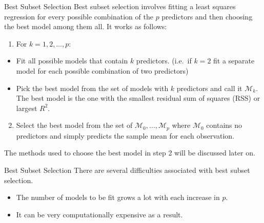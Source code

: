 \documentclass[
  ignorenonframetext,
  aspectratio=169,
]{beamer}
\providecommand{\tightlist}{%
  \setlength{\itemsep}{0pt}\setlength{\parskip}{0pt}}\usepackage{longtable,booktabs,array}
\begin{document}
\begin{frame}{Best Subset Selection}
\protect\hypertarget{best-subset-selection}{}
Best subset selection involves fitting a least squares regression for
every possible combination of the \(p\) predictors and then choosing the
best model among them all. It works as follows:

\begin{enumerate}
\tightlist
\item
  For \(k = 1,2, \dots, p\):
\end{enumerate}

\begin{itemize}
\item
  \alert{Fit all possible models that contain $k$ predictors.} (i.e.~if
  \(k = 2\) fit a separate model for each possible combination of two
  predictors)
\item
  \alert{Pick the best model from the set of models with $k$ predictors}
  and call it \(\mathcal{M}_k\). The best model is the one with the
  smallest residual sum of squares (RSS) or largest \(R^2\).
\end{itemize}

\begin{enumerate}
\setcounter{enumi}{1}
\tightlist
\item
  \alert{Select the best model} from the set of
  \(\mathcal{M}_{0}, \ldots, \mathcal{M}_{p}\) where \(\mathcal{M}_{0}\)
  contains no predictors and simply predicts the sample mean for each
  observation.
\end{enumerate}

The methods used to choose the best model in step 2 will be discussed
later on.
\end{frame}

\begin{frame}{Best Subset Selection}
\protect\hypertarget{best-subset-selection-1}{}
There are several difficulties associated with best subset selection.

\begin{itemize}
\item
  The number of models to be fit grows a lot with each increase in
  \(p\).
\item
  It can be very computationally expensive as a result.
\end{itemize}
\end{frame}
\end{document}
